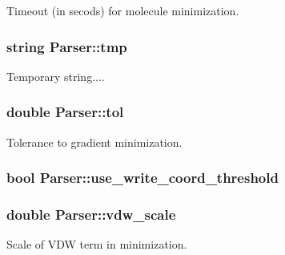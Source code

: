 Timeout (in secods) for molecule minimization. 

\hypertarget{classParser_a30d6b0f27feee6006fc83f3dc477493b}{
\subsubsection[{tmp}]{\setlength{\rightskip}{0pt plus 5cm}string {\bf Parser::tmp}}}
\label{classParser_a30d6b0f27feee6006fc83f3dc477493b}


Temporary string.... 

\hypertarget{classParser_a43b1eddc700d5b2049d1ee701592b96a}{
\subsubsection[{tol}]{\setlength{\rightskip}{0pt plus 5cm}double {\bf Parser::tol}}}
\label{classParser_a43b1eddc700d5b2049d1ee701592b96a}


Tolerance to gradient minimization. 

\hypertarget{classParser_adf5a767adcb85a53e31ef2ad7232c75e}{
\subsubsection[{use\_\-write\_\-coord\_\-threshold}]{\setlength{\rightskip}{0pt plus 5cm}bool {\bf Parser::use\_\-write\_\-coord\_\-threshold}}}
\label{classParser_adf5a767adcb85a53e31ef2ad7232c75e}
\hypertarget{classParser_a3dd10708e371fd27b05fcfb3e3caac62}{
\subsubsection[{vdw\_\-scale}]{\setlength{\rightskip}{0pt plus 5cm}double {\bf Parser::vdw\_\-scale}}}
\label{classParser_a3dd10708e371fd27b05fcfb3e3caac62}


Scale of VDW term in minimization. 


